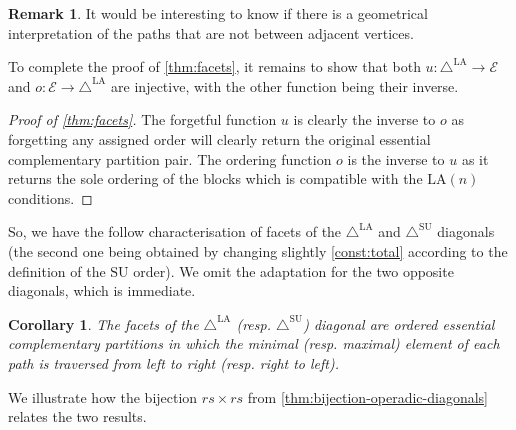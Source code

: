 \documentclass{amsart}
\newtheorem{corollary}[theorem]{Corollary}
\theoremstyle{definition}
\newtheorem{remark}[theorem]{Remark}
\newcommand{\SU}{\mathrm{SU}}
\newcommand{\LA}{\mathrm{LA}}
\newcommand{\SUD}{\triangle^{\mathrm{SU}}}
\newcommand{\LAD}{\triangle^{\mathrm{LA}}}
\newcommand{\EC}{\mathcal{E}} %
\begin{document}
\begin{remark}
    It would be interesting to know if there is a geometrical interpretation of the paths that are not between adjacent vertices. 
\end{remark}

To complete the proof of \cref{thm:facets}, it remains to show that both $u:\LAD \to \EC$ and $o:\EC\to \LAD$ are injective, with the other function being their inverse.

\begin{proof}[{Proof of \cref{thm:facets}}]
The forgetful function $u$ is clearly the inverse to $o$ as forgetting any assigned order will clearly return the original essential complementary partition pair. 
The ordering function $o$ is the inverse to $u$ as it returns the sole ordering of the blocks which is compatible with the $\LA(n)$ conditions.
\end{proof}

So, we have the follow characterisation of facets of the $\LAD$ and $\SUD$ diagonals (the second one being obtained by changing slightly \cref{const:total} according to the definition of the $\SU$ order).
We omit the adaptation for the two opposite diagonals, which is immediate.

\begin{corollary} 
\label{prop:LAD-ordered-EC}
The facets of the $\LAD$ (resp. $\SUD$) diagonal are ordered essential complementary partitions in which the minimal (resp. maximal) element of each path is traversed from left to right (resp. right to left).
\end{corollary}

We illustrate how the bijection $rs\times rs$ from \cref{thm:bijection-operadic-diagonals} relates the two results.
\end{document}
